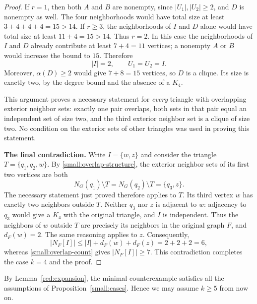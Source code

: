 \begin{proof}
If $r=1$, then both $A$ and $B$ are nonempty, since
$|U_1|,|U_2|\ge2$, and $D$ is nonempty as well. The four
neighborhoods would have total size at least
$3+4+4+4=15>14$. If $r\ge3$, the neighborhoods of $I$ and $D$
alone would have total size at least $11+4=15>14$. Thus $r=2$.
In this case the neighborhoods of $I$ and $D$ already contribute
at least $7+4=11$ vertices; a nonempty $A$ or $B$ would increase
the bound to $15$. Therefore
\begin{equation}
  |I|=2,\qquad U_1=U_2=I.
  \label{small:overlap-structure}
\end{equation}
Moreover, $\alpha(D)\ge2$ would give $7+8=15$ vertices, so $D$
is a clique. Its size is exactly two, by the degree bound and the
absence of a $K_4$.

This argument proves a necessary statement for \emph{every}
triangle with overlapping exterior neighbor sets: exactly one
pair overlaps, both sets in that pair equal an independent set
of size two, and the third exterior neighbor set is a clique of
size two. No condition on the exterior sets of other triangles
was used in proving this statement.

\medskip
\noindent\textbf{The final contradiction.}
Write $I=\{w,z\}$ and consider the triangle
$T=\{q_1,q_2,w\}$. By \eqref{small:overlap-structure}, the
exterior neighbor sets of its first two vertices are both
\[
  N_G(q_1)\setminus T=N_G(q_2)\setminus T=\{q_3,z\}.
\]
The necessary statement just proved therefore applies to $T$.
Its third vertex $w$ has exactly two neighbors outside $T$.
Neither $q_3$ nor $z$ is adjacent to $w$: adjacency to $q_3$
would give a $K_4$ with the original triangle, and $I$ is
independent. Thus the neighbors of $w$ outside $T$ are precisely
its neighbors in the original graph $F$, and $d_F(w)=2$.
The same reasoning applies to $z$. Consequently,
\[
  |N_F[I]|\le |I|+d_F(w)+d_F(z)=2+2+2=6,
\]
whereas \eqref{small:overlap-count} gives $|N_F[I]|\ge7$.
This contradiction completes the case $k=4$ and the proof.
\end{proof}

By Lemma~\ref{red:expansion}, the minimal counterexample satisfies
all the assumptions of Proposition~\ref{small:cases}. Hence we
may assume $k\ge5$ from now on.
